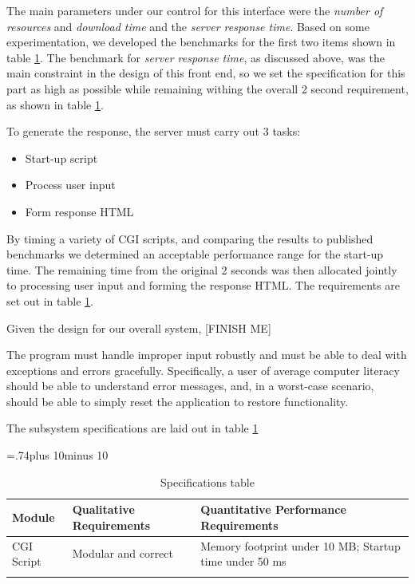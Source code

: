 The main parameters under our control for this interface were the
\emph{number of resources} and \emph{download time} and the \emph{server
  response time}. Based on some experimentation, we developed the
benchmarks for the first two items shown in table \ref{specs}. The
benchmark for \emph{server response time}, as discussed above, was the
main constraint in the design of this front end, so we set the
specification for this part as high as possible while remaining
withing the overall 2 second requirement, as shown in table
\ref{specs}.

To generate the response, the server must carry out 3 tasks:

\begin{itemize}
    \item Start-up script
    \item Process user input
    \item Form response HTML
\end{itemize}

By timing a variety of CGI scripts, and comparing the results to
published benchmarks\cite{cgi-benchmark} we determined an acceptable
performance range for the start-up time. The remaining time from the
original 2 seconds was then allocated jointly to processing user input
and forming the response HTML. The requirements are set out in table
\ref{specs}.

Given the design for our overall system, [FINISH ME]


The program must handle improper input robustly and must be able to
deal with exceptions and errors gracefully. Specifically, a user of
average computer literacy should be able to understand error messages,
and, in a worst-case scenario, should be able to simply reset the
application to restore functionality.

The subsystem specifications are laid out in table \ref{specs}
\begin{table}[htp]
  \newlength\midcolumnwidth
  \midcolumnwidth=.74\textwidth plus 10\tabcolsep minus 10\tabcolsep
  \centering
  \caption{Specifications table}
  \label{specs}
  \begin{tabular}{%
    >{\raggedright}p{}%
    p{\midcolumnwidth}%
    >{\raggedright\arraybackslash}p{}}
  \firsthline
  \bfseries Module & \bfseries Qualitative Requirements & \bfseries
  Quantitative Performance Requirements \\ \hline
  CGI Script & Modular and correct & Memory footprint under 10 MB;
  Startup time under 50 ms \\
  \lasthline
  \end{tabular}
\end{table}

